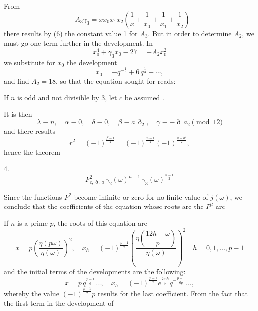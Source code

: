 From
\[
-A_3\gamma_3 = x x_0 x_1 x_2\left(\frac{1}{x}+\frac{1}{x_0}+\frac{1}{x_1}+\frac{1}{x_2}\right)
\]
there results by (6) the constant value 1 for $A_3$. But in order to
determine $A_2$, we must go one term further in the development. In
\[
x_0^4 + \gamma_3 x_0 - 27 = -A_2 x_0^2
\]
we substitute for $x_0$ the development
\[
x_0 = -q^{-\frac{1}{3}} + 6\,q^{\frac{1}{3}} + \cdots,
\]
and find $A_2 = 18$, so that the equation sought for reads:

If $n$ is odd and not divisible by 3, let $c$ be assumed .

It is then
\[
\lambda \equiv n, \quad \alpha \equiv 0, \quad \delta \equiv 0, \quad
\beta \equiv a\,\eth_2, \quad \gamma \equiv -\eth\,a_2 \pmod{12}
\]
and there results
\[
r^2 = (-1)^{\frac{\beta-1}{2}} = (-1)^{\frac{n-1}{2}}(-1)^{\frac{a-a'}{2}}, %
\]
hence the theorem

4. 
\[
P^{2}_{c,\eth,a}\,\gamma_2(\omega)^{n-1}\,\gamma_3(\omega)^{\frac{n-1}{2}}
\]

Since the functions $P^2$ become infinite or zero for no finite value
of $j(\omega)$, we conclude that the coefficients of the equation
whose roots are the $P^2$ are 

If $n$ is a prime $p$, the roots of this equation are
\[
x = p\left(\frac{\eta(p\omega)}{\eta(\omega)}\right)^2, \quad
x_h = (-1)^{\frac{p-1}{2}}\left(\frac{\eta\left(\dfrac{12h+\omega}{p}\right)}{\eta(\omega)}\right)^2
\quad h=0,1,\dots,p-1
\]
and the initial terms of the developments are the following:
\[
x = p\,q^{\frac{p-1}{6}}\dots, \quad
x_h = (-1)^{\frac{p-1}{2}}e^{\frac{2\pi i h}{p}}q^{-\frac{p-1}{6p}}\dots,
\]
whereby the value $(-1)^{\frac{p-1}{2}}p$ results for the last
coefficient. From the fact that the first term in the development of
